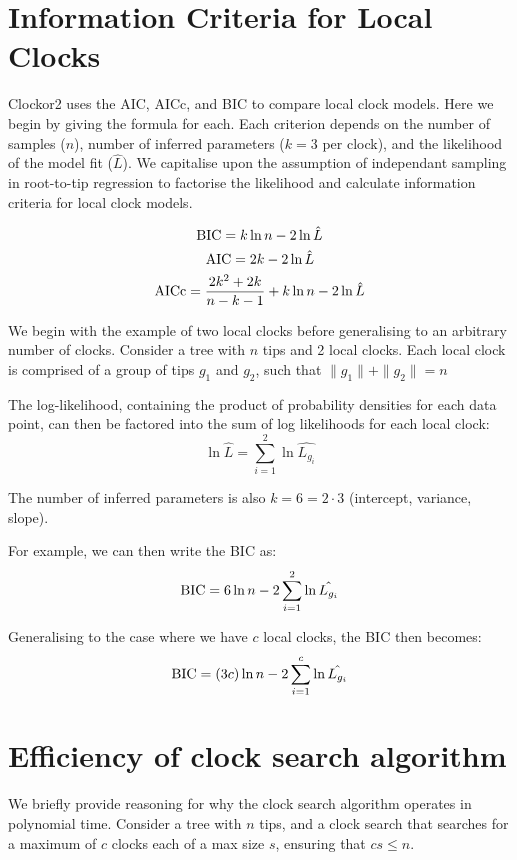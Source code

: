 \documentclass{article}
\begin{document}
\section{Information Criteria for Local Clocks}
Clockor2 uses the AIC, AICc, and BIC to compare local clock models. Here we begin by giving the formula for each. Each criterion depends on the number of samples ($n$), number of inferred parameters ($k=3$ per clock), and the likelihood of the model fit ($\hat{L}$). We capitalise upon the assumption of independant sampling in root-to-tip regression to factorise the likelihood and calculate information criteria for local clock models.

\begin{equation}
    \textnormal{BIC} = k\ln{n} - 2\ln{\hat{L}}
\end{equation}
\begin{equation}
    \textnormal{AIC} = 2k - 2\ln{\hat{L}}
\end{equation}
\begin{equation}
    \textnormal{AICc} = \frac{2k^2+2k}{n-k-1} + k\ln{n} - 2\ln{\hat{L}}
\end{equation}

We begin with the example of two local clocks before generalising to an arbitrary number of clocks. Consider a tree with $n$ tips and 2 local clocks. Each local clock is comprised of a group of tips $g_1$ and $g_2$, such that $ \|g_1\| + \|g_2\| = n $

The log-likelihood, containing the product of probability densities for each data point, can then be factored into the sum of log likelihoods for each local clock:
\begin{equation}
    \ln{\hat{L}} = \sum_{i=1}^{2} \ln{\hat{L_{g_{i}}}}
\end{equation}

The number of inferred parameters is also $k = 6 = 2\cdot3$ (intercept, variance, slope).

For example, we can then write the BIC as:
\begin{equation}
    \textnormal{BIC} = 6\ln{n} - 2\sum_{i=1}^{2} \ln{\hat{L_{g_{i}}}}
\end{equation}

Generalising to the case where we have $c$ local clocks, the BIC then becomes:
\begin{equation}
    \textnormal{BIC} = (3c)\ln{n} - 2\sum_{i=1}^{c} \ln{\hat{L_{g_{i}}}}
\end{equation}

\section{Efficiency of clock search algorithm}
We briefly provide reasoning for why the clock search algorithm operates in polynomial time.
Consider a tree with $n$ tips, and a clock search that searches for a maximum of $c$ clocks each of a max size $s$, ensuring that $cs \le n$.
\end{document}

